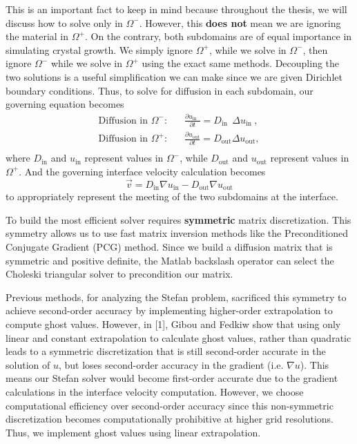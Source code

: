 \documentclass[oneside,12pt,final]{/Applications/TeX/packages/ucthesis-CA2012}
\begin{document}
\begin{mainmatter}
This is an important fact to keep in mind because throughout the thesis, we will discuss how to solve only in $\Omega^-$. However, this \textbf{does not} mean we are ignoring the material in $\Omega^+$. On the contrary, both subdomains are of equal importance in simulating crystal growth. We simply ignore $\Omega^+$, while we solve in $\Omega^-$, then ignore $\Omega^-$ while we solve in $\Omega^+$ using the exact same methods. Decoupling the two solutions is a useful simplification we can make since we are given Dirichlet boundary conditions. Thus, to solve for diffusion in each subdomain, our governing equation becomes
\begin{equation}\label{eqn:governing_diff}
\begin{aligned}
\text{Diffusion in $\Omega^-$:}& \quad \frac{\partial u_\text{in  } \>}{\partial t} = D_\text{in  }\> \Delta u_\text{in  },\>\\
\text{Diffusion in $\Omega^+$:}& \quad \frac{\partial u_\text{out}}{\partial t} = D_\text{out} \Delta u_\text{out},\\
\end{aligned}
\end{equation}
where $D_\text{in}$ and $u_\text{in}$ represent values in $\Omega^-$, while $D_\text{out}$ and $u_\text{out}$ represent values in $\Omega^+$. And the governing interface velocity calculation becomes
\begin{equation}
\vec{v} = D_\text{in} \nabla u_\text{in} - D_\text{out} \nabla u_\text{out}
\end{equation}
to appropriately represent the meeting of the two subdomains at the interface.

To build the most efficient solver requires \textbf{symmetric} matrix discretization. This symmetry allows us to use fast matrix inversion methods like the Preconditioned Conjugate Gradient (PCG) method. Since we build a diffusion matrix that is symmetric and positive definite, the Matlab backslash operator can select the Choleski triangular solver to precondition our matrix.

Previous methods, for analyzing the Stefan problem, sacrificed this symmetry to achieve second-order accuracy by implementing higher-order extrapolation to compute ghost values. However, in [1], Gibou and Fedkiw show that using only linear and constant extrapolation to calculate ghost values, rather than quadratic leads to a symmetric discretization that is still second-order accurate in the solution of $u$, but loses second-order accuracy in the gradient (i.e. $\nabla u$). This means our Stefan solver would become first-order accurate due to the gradient calculations in the interface velocity computation. However, we choose computational efficiency over second-order accuracy since this non-symmetric discretization becomes computationally prohibitive at higher grid resolutions. Thus, we implement ghost values using linear extrapolation.


\end{mainmatter}
\end{document}
